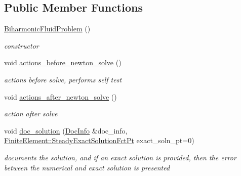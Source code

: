 \subsection*{Public Member Functions}
\begin{DoxyCompactItemize}
\item 
\hyperlink{classoomph_1_1BiharmonicFluidProblem_a258f8f42491569c4727c54cd8f8f17d5}{Biharmonic\+Fluid\+Problem} ()
\begin{DoxyCompactList}\small\item\em constructor \end{DoxyCompactList}\item 
void \hyperlink{classoomph_1_1BiharmonicFluidProblem_ad62b36f8b36faae1324fe29fcd8e0875}{actions\+\_\+before\+\_\+newton\+\_\+solve} ()
\begin{DoxyCompactList}\small\item\em actions before solve, performs self test \end{DoxyCompactList}\item 
void \hyperlink{classoomph_1_1BiharmonicFluidProblem_a6a69be0763564ffd22f598d734d11a26}{actions\+\_\+after\+\_\+newton\+\_\+solve} ()
\begin{DoxyCompactList}\small\item\em action after solve \end{DoxyCompactList}\item 
void \hyperlink{classoomph_1_1BiharmonicFluidProblem_a095e8526d834c05c492929bd5017dfa5}{doc\+\_\+solution} (\hyperlink{classoomph_1_1DocInfo}{Doc\+Info} \&doc\+\_\+info, \hyperlink{classoomph_1_1FiniteElement_a690fd33af26cc3e84f39bba6d5a85202}{Finite\+Element\+::\+Steady\+Exact\+Solution\+Fct\+Pt} exact\+\_\+soln\+\_\+pt=0)
\begin{DoxyCompactList}\small\item\em documents the solution, and if an exact solution is provided, then the error between the numerical and exact solution is presented \end{DoxyCompactList}\end{DoxyCompactItemize}
